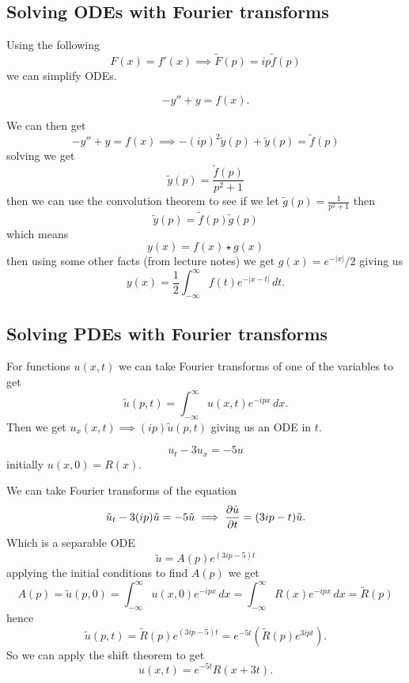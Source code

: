 \documentclass[10pt, a4paper]{article}
\begin{document}
\subsection{Solving ODEs with Fourier transforms}
Using the following
\[
F(x) = f'(x) \implies \tilde{F}(p) = ip\tilde{f}(p)
\]
we can simplify ODEs.

\begin{example}
    \[
    -y'' + y = f(x).
    \]

    We can then get
    \[
    -y'' + y = f(x) \implies -(ip) ^ 2\tilde{y}(p) + \tilde{y}(p) = \tilde{f}(p)
    \]
    solving we get
    \[
    \tilde{y}(p) = \frac{\tilde{f}(p)}{p ^ 2 + 1}
    \]
    then we can use the convolution theorem to see if we let $\tilde{g}(p) = \frac{1}{p ^ 2 + 1}$ then
    \[
    \tilde{y}(p) = \tilde{f}(p)\tilde{g}(p)
    \]
    which means
    \[
    y(x) = f(x) \star g(x)
    \]
    then using some other facts
    (from lecture notes)
    we get $g(x) = e ^ {-|x|} / 2$ giving us
    \[
    y(x) = \frac{1}{2}\int_{-\infty}^{\infty}f(t)e ^ {-|x - t|}\,dt.
    \]
\end{example}

\subsection{Solving PDEs with Fourier transforms}
For functions $u(x, t)$ we can take Fourier transforms of one of the variables to get
\[
\tilde{u}(p, t) = \int_{-\infty}^{\infty}u(x, t)e ^ {-ipx}\,dx.
\]
Then we get $u_{x}(x, t) \implies (ip)\tilde{u}(p, t)$ giving us an ODE in $t$.

\begin{example}
    \[
    u_t - 3u_x = -5u
    \]
    initially $u(x, 0) = R(x)$.

    We can take Fourier transforms of the equation
    \[
    \tilde{u}_t - 3(ip)\tilde{u} = -5\tilde{u} \implies \pd[\tilde{u}]{t} = (3ip - t)\tilde{u}.
    \]
    Which is a separable ODE
    \[
    \tilde{u} = A(p)e ^ {(3ip - 5)t}
    \]
    applying the initial conditions to find $A(p)$ we get
    \[
    A(p) = \tilde{u}(p, 0) = \int_{-\infty}^{\infty}u(x, 0)e ^ {-ipx}\,dx = \int_{-\infty}^{\infty}R(x)e ^ {-ipx}\,dx = \tilde{R}(p)
    \]
    hence
    \[
    \tilde{u}(p, t) = \tilde{R}(p)e ^ {(3ip - 5)t} = e ^ {-5t}(\tilde{R}(p)e ^ {3ipt}).
    \]
    So we can apply the shift theorem to get
    \[
    u(x, t) = e ^ {-5t}R(x + 3t).
    \]
\end{example}
\end{document}

